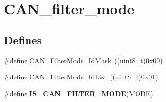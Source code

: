 \hypertarget{group__CAN__filter__mode}{
\section{CAN\_\-filter\_\-mode}
\label{group__CAN__filter__mode}
}
\subsection*{Defines}
\begin{DoxyCompactItemize}
\item 
\#define \hyperlink{group__CAN__filter__mode_ga8136e518fb31fd91079e4c7c4c19c94b}{CAN\_\-FilterMode\_\-IdMask}~((uint8\_\-t)0x00)
\item 
\#define \hyperlink{group__CAN__filter__mode_ga91e9144f71b15ac345ee89314711c158}{CAN\_\-FilterMode\_\-IdList}~((uint8\_\-t)0x01)
\item 
\#define {\bfseries IS\_\-CAN\_\-FILTER\_\-MODE}(MODE)
\end{DoxyCompactItemize}



